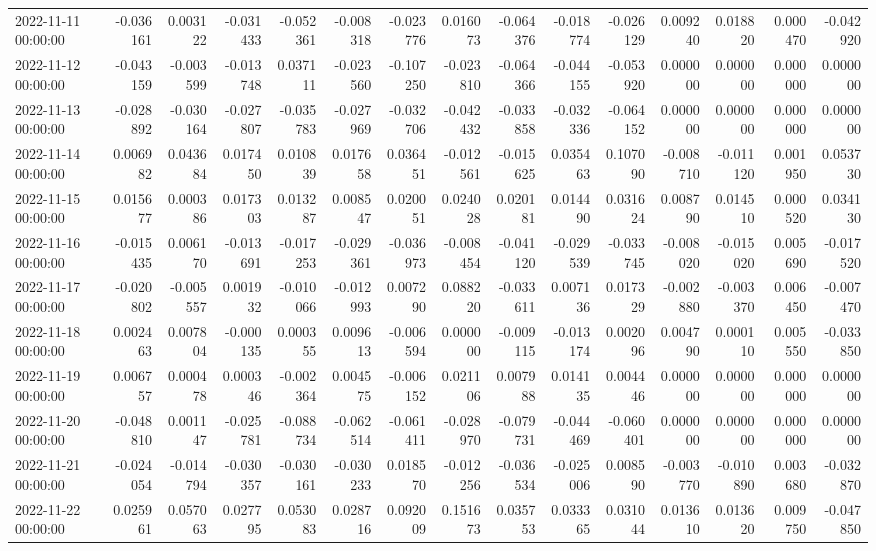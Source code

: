 \begin{tabular}{lrrrrrrrrrrrrrr}
2022-11-11 00:00:00 & -0.036161 & 0.003122 & -0.031433 & -0.052361 & -0.008318 & -0.023776 & 0.016073 & -0.064376 & -0.018774 & -0.026129 & 0.009240 & 0.018820 & 0.000470 & -0.042920 \\
2022-11-12 00:00:00 & -0.043159 & -0.003599 & -0.013748 & 0.037111 & -0.023560 & -0.107250 & -0.023810 & -0.064366 & -0.044155 & -0.053920 & 0.000000 & 0.000000 & 0.000000 & 0.000000 \\
2022-11-13 00:00:00 & -0.028892 & -0.030164 & -0.027807 & -0.035783 & -0.027969 & -0.032706 & -0.042432 & -0.033858 & -0.032336 & -0.064152 & 0.000000 & 0.000000 & 0.000000 & 0.000000 \\
2022-11-14 00:00:00 & 0.006982 & 0.043684 & 0.017450 & 0.010839 & 0.017658 & 0.036451 & -0.012561 & -0.015625 & 0.035463 & 0.107090 & -0.008710 & -0.011120 & 0.001950 & 0.053730 \\
2022-11-15 00:00:00 & 0.015677 & 0.000386 & 0.017303 & 0.013287 & 0.008547 & 0.020051 & 0.024028 & 0.020181 & 0.014490 & 0.031624 & 0.008790 & 0.014510 & 0.000520 & 0.034130 \\
2022-11-16 00:00:00 & -0.015435 & 0.006170 & -0.013691 & -0.017253 & -0.029361 & -0.036973 & -0.008454 & -0.041120 & -0.029539 & -0.033745 & -0.008020 & -0.015020 & 0.005690 & -0.017520 \\
2022-11-17 00:00:00 & -0.020802 & -0.005557 & 0.001932 & -0.010066 & -0.012993 & 0.007290 & 0.088220 & -0.033611 & 0.007136 & 0.017329 & -0.002880 & -0.003370 & 0.006450 & -0.007470 \\
2022-11-18 00:00:00 & 0.002463 & 0.007804 & -0.000135 & 0.000355 & 0.009613 & -0.006594 & 0.000000 & -0.009115 & -0.013174 & 0.002096 & 0.004790 & 0.000110 & 0.005550 & -0.033850 \\
2022-11-19 00:00:00 & 0.006757 & 0.000478 & 0.000346 & -0.002364 & 0.004575 & -0.006152 & 0.021106 & 0.007988 & 0.014135 & 0.004446 & 0.000000 & 0.000000 & 0.000000 & 0.000000 \\
2022-11-20 00:00:00 & -0.048810 & 0.001147 & -0.025781 & -0.088734 & -0.062514 & -0.061411 & -0.028970 & -0.079731 & -0.044469 & -0.060401 & 0.000000 & 0.000000 & 0.000000 & 0.000000 \\
2022-11-21 00:00:00 & -0.024054 & -0.014794 & -0.030357 & -0.030161 & -0.030233 & 0.018570 & -0.012256 & -0.036534 & -0.025006 & 0.008590 & -0.003770 & -0.010890 & 0.003680 & -0.032870 \\
2022-11-22 00:00:00 & 0.025961 & 0.057063 & 0.027795 & 0.053083 & 0.028716 & 0.092009 & 0.151673 & 0.035753 & 0.033365 & 0.031044 & 0.013610 & 0.013620 & 0.009750 & -0.047850 \\

\end{tabular}
